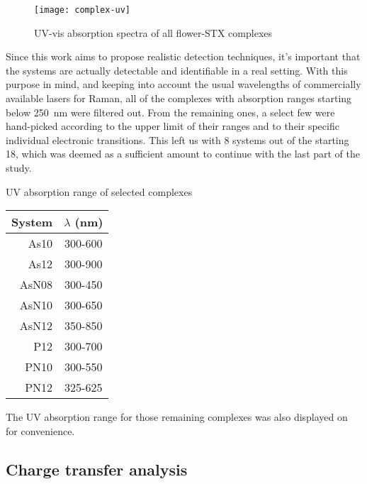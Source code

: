 \begin{figure*}
    \texttt{[image: complex-uv]}
    \caption[UV-vis absorption spectra of all complexes]{UV-vis absorption spectra of all flower-STX complexes}
\end{figure*}

Since this work aims to propose realistic detection techniques, it's important that the systems are actually detectable and identifiable in a real setting.
With this purpose in mind, and keeping into account the usual wavelengths of commercially available lasers for Raman, all of the complexes with absorption ranges starting below \SI{250}{\nano\metre} were filtered out.
From the remaining ones, a select few were hand-picked according to the upper limit of their ranges and to their specific individual electronic transitions.
This left us with 8 systems out of the starting 18, which was deemed as a sufficient amount to continue with the last part of the study.

\begin{margintable}
    \centering
    \caption[UV absorption range of selected complexes]{UV absorption range of selected complexes}
    \begin{tabular}{@{}rc@{}}
        \toprule
        System & $\lambda$ (\si{\nano\metre}) \\
        \midrule
        As10 & 300-600 \\
        As12 & 300-900 \\
        AsN08 & 300-450 \\
        AsN10 & 300-650 \\
        AsN12 & 350-850 \\
        P12 & 300-700 \\
        PN10 & 300-550 \\
        PN12 & 325-625 \\
    \end{tabular}
\end{margintable}

The UV absorption range for those remaining complexes was also displayed on  for convenience.
\blindtext

\subsection{Charge transfer analysis}
\blindtext

